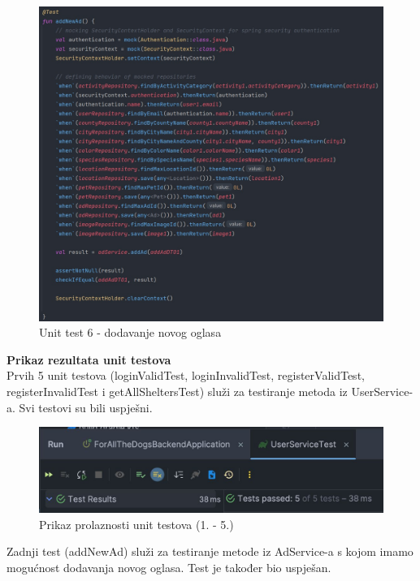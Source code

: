 		\begin{figure}[H]
			\includegraphics[scale=0.5]{slike/unit6.PNG} 
			\centering
			\caption{Unit test 6 - dodavanje novog oglasa}
			\label{unit6}
		\end{figure}

\pagebreak
		
\textbf{Prikaz rezultata unit testova}\\

Prvih 5 unit testova (loginValidTest, loginInvalidTest, registerValidTest, registerInvalidTest i getAllSheltersTest) služi za testiranje metoda iz UserService-a. Svi testovi su bili uspješni.

		\begin{figure}[H]
			\includegraphics[scale=0.45]{slike/5unitrez.PNG} 
			\centering
			\caption{Prikaz prolaznosti unit testova (1. - 5.)}
			\label{5unitrez}
		\end{figure}
		
		
Zadnji test (addNewAd) služi za testiranje metode iz AdService-a s kojom imamo mogućnost dodavanja novog oglasa. Test je također bio uspješan.


